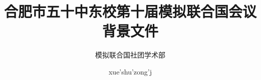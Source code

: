 \documentclass{article}
\title{合肥市五十中东校第十届模拟联合国会议\\\huge 背景文件}
\author{模拟联合国社团学术部 \and xue'shu'zong'j}
\begin{document}
    \centering
    \maketitle
    \clearpage
    \tableofcontents
\end{document}
